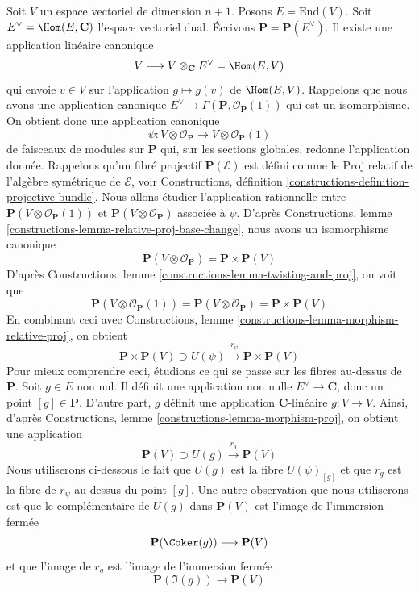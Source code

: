 \noindent
Soit $V$ un espace vectoriel de dimension $n + 1$. Posons $E = \text{End}(V)$.
Soit $E^\vee = \Hom(E, \mathbf{C})$ l'espace vectoriel dual.
Écrivons $\mathbf{P} = \mathbf{P}(E^\vee)$.
Il existe une application linéaire canonique
$$
V \longrightarrow V \otimes_\mathbf{C} E^\vee = \Hom(E, V)
$$
qui envoie $v \in V$ sur l'application $g \mapsto g(v)$ de $\Hom(E, V)$.
Rappelons que nous avons une application canonique
$E^\vee \to \Gamma(\mathbf{P}, \mathcal{O}_\mathbf{P}(1))$
qui est un isomorphisme. On obtient donc une application canonique
$$
\psi : V \otimes \mathcal{O}_\mathbf{P} \to V \otimes \mathcal{O}_\mathbf{P}(1)
$$
de faisceaux de modules sur $\mathbf{P}$ qui, sur les sections globales, redonne
l'application donnée. Rappelons qu'un fibré projectif $\mathbf{P}(\mathcal{E})$
est défini comme le Proj relatif de l'algèbre symétrique de $\mathcal{E}$, voir
Constructions, définition \ref{constructions-definition-projective-bundle}.
Nous allons étudier l'application rationnelle
entre $\mathbf{P}(V \otimes \mathcal{O}_\mathbf{P}(1))$ et
$\mathbf{P}(V \otimes \mathcal{O}_\mathbf{P})$ associée à $\psi$. D'après
Constructions, lemme \ref{constructions-lemma-relative-proj-base-change},
nous avons un isomorphisme canonique
$$
\mathbf{P}(V \otimes \mathcal{O}_\mathbf{P}) = \mathbf{P} \times \mathbf{P}(V)
$$
D'après Constructions, lemme \ref{constructions-lemma-twisting-and-proj},
on voit que
$$
\mathbf{P}(V \otimes \mathcal{O}_\mathbf{P}(1)) =
\mathbf{P}(V \otimes \mathcal{O}_\mathbf{P}) = \mathbf{P} \times \mathbf{P}(V)
$$
En combinant ceci avec
Constructions, lemme \ref{constructions-lemma-morphism-relative-proj},
on obtient
\begin{equation}
\label{equation-r-psi}
\mathbf{P} \times \mathbf{P}(V) \supset
U(\psi) \xrightarrow{r_\psi} \mathbf{P} \times \mathbf{P}(V)
\end{equation}
Pour mieux comprendre ceci, étudions ce qui se passe sur les fibres au-dessus de
$\mathbf{P}$. Soit $g \in E$ non nul. Il définit une application non nulle
$E^\vee \to \mathbf{C}$, donc un point $[g] \in \mathbf{P}$.
D'autre part, $g$ définit une application $\mathbf{C}$-linéaire $g : V \to V$.
Ainsi, d'après
Constructions, lemme \ref{constructions-lemma-morphism-proj},
on obtient une application
$$
\mathbf{P}(V) \supset U(g) \xrightarrow{r_g} \mathbf{P}(V)
$$
Nous utiliserons ci-dessous le fait que $U(g)$ est la fibre $U(\psi)_{[g]}$ et
que $r_g$ est la fibre de $r_\psi$ au-dessus du point $[g]$. Une autre observation
que nous utiliserons est que le complémentaire de $U(g)$ dans $\mathbf{P}(V)$ est
l'image de l'immersion fermée
$$
\mathbf{P}(\Coker(g)) \longrightarrow \mathbf{P}(V)
$$
et que l'image de $r_g$ est l'image de l'immersion fermée
$$
\mathbf{P}(\Im(g)) \longrightarrow \mathbf{P}(V)
$$

